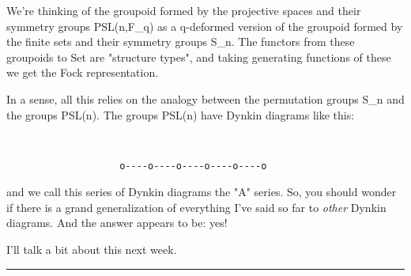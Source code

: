 We're thinking of the groupoid formed by the projective spaces and their
symmetry groups PSL(n,F_{q}) as a q-deformed version of the groupoid
formed by the finite sets and their symmetry groups S_{n}.   The functors
from these groupoids to Set are "structure types", and taking generating
functions of these we get the Fock representation.

In a sense, all this relies on the analogy between the permutation
groups S_{n} and the groups PSL(n).   The groups PSL(n) have Dynkin
diagrams like this: 

               

\begin{verbatim}


                    o----o----o----o----o----o

\end{verbatim}
    
and we call this series of Dynkin diagrams the "A" series.  So, you
should wonder if there is a grand generalization of everything I've
said so far to \emph{other} Dynkin diagrams.  And the answer appears to be:
yes!  

I'll talk a bit about this next week.

\par\noindent\rule{\textwidth}{0.4pt}
